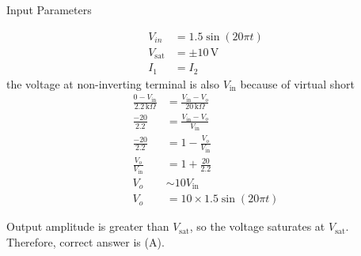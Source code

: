 \documentclass[journal,12pt,twocolumn]{IEEEtran}
\begin{document}
\begin{table}[htbp]
  \centering
  
  \caption{Input Parameters}
  \label{tab:PH.11.table1}
\end{table}
\begin{align}
V_{in} &= 1.5 \sin(20\pi t)\\
V_{\text{sat}} &= \pm 10 \, \text{V}\\
I_1 &= I_2
\end{align}
the voltage at non-inverting terminal is also \( V_{\text{in}} \) because of virtual short\\
\begin{align}
\frac{0 - V_{\text{in}}}{2.2 \, \text{k}\Omega} &= \frac{V_{\text{in}} - V_o}{20 \, \text{k}\Omega}\\
\frac{-20}{2.2} &= \frac{V_{\text{in}} - V_o}{V_{\text{in}}}\\
\frac{-20}{2.2} &= 1 - \frac{V_o}{V_{\text{in}}}\\
\frac{V_o}{V_{\text{in}}} &= 1 + \frac{20}{2.2}\\
V_o &\sim 10 V_{\text{in}}\\
V_o &= 10 \times 1.5 \sin(20\pi t)
\end{align}

Output amplitude is greater than $V_{\text{sat}}$, so the voltage saturates at $V_{\text{sat}}$.\\
Therefore, correct answer is (A).
\end{document}

